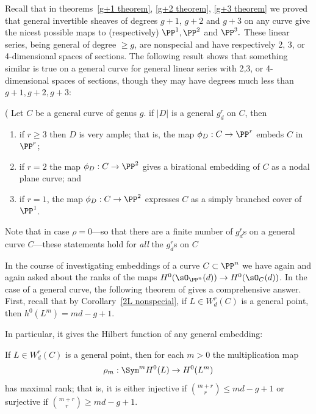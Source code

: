 Recall that  in theorems~\ref{g+1 theorem}, \ref{g+2 theorem}, \ref{g+3 theorem} we proved that
general invertible sheaves of degrees $g+1$, $g+2$ and $g+3$ on any curve
give the nicest possible maps to (respectively) $\PP^1, \PP^2$ and $\PP^3.$ These
linear series, being general of degree $\geq g$, are  nonspecial and have respectively
2, 3, or 4-dimensional spaces of sections. The following result shows that something
similar is true on a general curve for general linear series with 2,3, or 4-dimensional
spaces of sections, though they may have degrees much less than $g+1, g+2, g+3$:

\begin{theorem}\label{grd omnibus}(\cite[Proposition 5.4]{Eisenbud-Harris83}
Let $C$ be a general curve of genus $g$.
 if $|D|$ is a general $g^r_d$ on $C$, then

 \begin{enumerate}
\item if $r \geq 3$ then $D$ is very ample; that is, the map $\phi_D : C \to \PP^r$   embeds $C$ in $\PP^r$;
\item if $r=2$ the map $\phi_D : C \to \PP^2$ gives a birational embedding of $C$ as a nodal plane curve; and 
\item if $r=1$, the map $\phi_D : C \to \PP^2$ expresses $C$ as a simply branched cover of $\PP^1$.
\end{enumerate}
\end{theorem}

Note that in case $\rho = 0$---so that there are a finite number of $g^r_d$s on a general curve $C$---these statements hold for \emph{all} the $g^r_d$s on $C$

In the course of investigating embeddings of a curve $C\subset \PP^n$ we have again and again
asked about the ranks of the maps $H^0(\sO_{\PP^n}(d)) \to H^0(\sO_C(d))$. In the case of
a general curve, the following theorem of \cite{ELarson2018} gives a comprehensive answer. First, recall that by Corollary~\ref{2L nonspecial}, if $L \in W^r_d(C)$ is a general point, then $h^0(L^m) = md-g+1$.

In particular, it gives
 the Hilbert function of any general embedding:
 
\begin{theorem}[Larson]\label{maximal rank}
If $L \in W^r_d(C)$ is a general point, then for each $m > 0$ the multiplication map
$$
\rho_m : \Sym^m H^0(L) \to H^0(L^m)
$$
has maximal rank; that is, it is either injective if $\binom{m+r}{r} \leq md-g+1$ or surjective if $\binom{m+r}{r} \geq md-g+1$.
\end{theorem}


